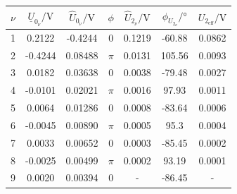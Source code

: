 \documentclass[a4paper, 12pt]{article}
\begin{document}
      \begin{table}[H]
        \begin{center}
        \begin{tabular}{@{}ccccccc@{}}
        \toprule
        $\nu$ & $\underline{U}_{0_\nu} / \si{\volt}$ & $\hat{U}_{0_\nu}/ \si{\volt}$ & $\phi$ & $\hat{U}_{2_\nu}/ \si{\volt}$ & $\phi_{U_{2_\nu}}/ \si{\degree}$ & $U_{2_{\text{eff}}}/ \si{\volt}$ \\ \midrule
                1     & 0.2122                              & -0.4244                       & 0      &        0.1219                        & -60.88                           &       0.0862                           \\
        2     & -0.4244                             & 0.08488                       & $\pi$  &               0.0131               & 105.56                           &              0.0093                    \\
        3     & 0.0182                              & 0.03638                       & 0      &               0.0038          & -79.48                           &               0.0027                   \\
        4     & -0.0101                             & 0.02021                       & $\pi$  &               0.0016                & 97.93                            &              0.0011                    \\
        5     & 0.0064                              & 0.01286                       & 0      &               0.0008                & -83.64                           &               0.0006                   \\
        6     & -0.0045                             & 0.00890                       & $\pi$  &               0.0005                & 95.3                             &              0.0004                    \\
        7     & 0.0033                              & 0.00652                       & 0      &               0.0003                & -85.45                           &               0.0002                   \\
        8     & -0.0025                             & 0.00499                       & $\pi$  &               0.0002                & 93.19                            &              0.0001                    \\
        9     & 0.0020                              & 0.00394                       & 0      &                 -              & -86.45                           &                -                  \\

\end{tabular}
\end{center}
\end{table}
\end{document}
